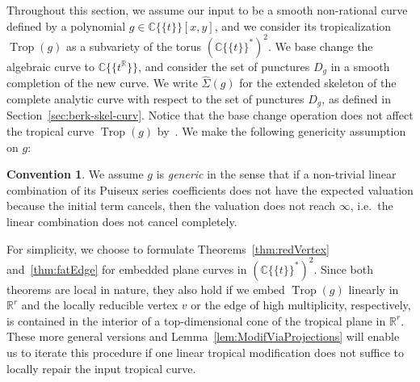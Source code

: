 \documentclass[11pt]{amsart}
\numberwithin{equation}{section}
\theoremstyle{plain}
\theoremstyle{definition}
\newtheorem{convention}[theorem]{Convention}
\theoremstyle{remark}
\begin{document}
Throughout this section, we assume our input to be a smooth
non-rational curve  defined by a polynomial $g\in {{\mathbb{C}}\{\!\{t
\}\!\}}[x,y]$,
and we consider its tropicalization $\operatorname{Trop}(g)$ as a subvariety of the
torus $({{\mathbb{C}}\{\!\{t
\}\!\}}^*)^2$.  We base change the algebraic
curve to ${\mathbb{C}}\{\!\{t^{\mathbb{R}}\}\!\}$, and consider the set of punctures
$D_g$ in a smooth completion of the new curve.  We write
$\widehat{\Sigma}(g)$ for the extended skeleton of the complete
analytic curve  with respect to the set of punctures $D_g$, as
defined in Section~\ref{sec:berk-skel-curv}. Notice that the base
change operation does not affect the tropical curve $\operatorname{Trop}(g)$
by~\cite[Proposition 3.7]{Gubler13}.  We make the following genericity
assumption on $g$:
\begin{convention}\label{genericityassumption}
We assume $g$ is \emph{generic} in the sense that if a non-trivial linear combination of its Puiseux series coefficients does not have the expected valuation because the initial term cancels, then the valuation does not reach $\infty$, i.e.\ the linear combination does not cancel completely.
\end{convention}

For simplicity, we choose to formulate Theorems~\ref{thm:redVertex}
and~\ref{thm:fatEdge} for embedded plane curves in $({{\mathbb{C}}\{\!\{t
\}\!\}}^*)^2$. Since
both theorems are local in nature, they also hold if we embed
$\operatorname{Trop}(g)$ linearly in ${\mathbb{R}}^r$ and the locally reducible vertex $v$ or
the edge of high multiplicity, respectively, is contained in the
interior of a top-dimensional cone of the tropical plane in
${\mathbb{R}}^r$. These more general versions and
Lemma~\ref{lem:ModifViaProjections} will enable us to iterate this
procedure if one linear tropical modification does not suffice to
locally repair the input tropical curve.
\end{document}
